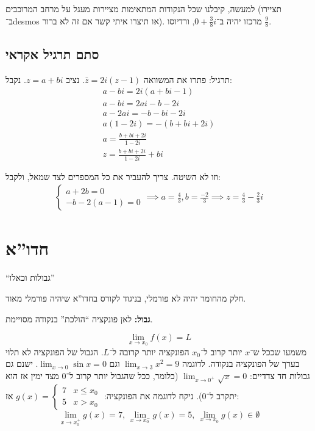 \documentclass[]{article}
\begin{document}
	למעשה, קיבלנו שכל הנקודות המתאימות מציירות מעגל על מרחב המרוכבים (תציירו ב־desmos או תיצרו איתי קשר אם זה לא ברור). מרכזו יהיה ב־$0 + \frac{3}{8}i$, ורדיוסו $\frac{9}{8}$. 
	
	\subsection{סתם תרגיל אקראי}
	תרגיל: פתרו את המשוואה $\bar z = 2i(z - 1)$. נציב $z = a + bi$. נקבל: 
	\begin{gather}
		a - bi = 2i(a + bi - 1) \\
		a - bi = 2ai - b - 2i \\
		a - 2ai = -b -bi - 2i \\
		a(1 - 2i) = - (b + bi + 2i) \\
		a = \frac{b + bi + 2i}{1 - 2i} \\
		z = \frac{b + bi + 2i}{1 - 2i} + bi
	\end{gather}
	
	וזו לא השיטה. צריך להעביר את כל המספרים לצד שמאל, ולקבל: 
	\begin{gather}
		\begin{cases}
			a + 2b = 0 \\
			-b - 2(a - 1) = 0
		\end{cases}
		\implies a = \frac{4}{3}, b = \frac{-2}{3} \implies z = \frac{4}{3} - \frac{2}{3}i
	\end{gather}
	
	\section{חדו''א}
	``גבולות וכאלו''
	
	חלק מהחומר יהיה לא פורמלי, בניגוד לקורס בחדו''א שיהיה פורמלי מאוד. 
	
	\textbf{גבול: }לאן פונקציה ``הולכת'' בנקודה מסויימת. 
	
	\[ \lim_{x \to x_0} f(x) = L \]
	משמעו שככל ש־$x$ יותר קרוב ל־$x_0 $ הפונקציה יותר קרובה ל־$L$. הגבול של הפונקציה לא תלוי בערך של הפונקציה בנקודה. 
	לדוגמה $\lim_{x \to 3} x^2 = 9$ וגם $\lim_{x \to 0} \sin x = 0$. ישנם גם גבולות חד צדדיים: $\lim_{x \to 0^+} \sqrt{x} = 0 $ (כלומר, ככל שהגבול יותר קרוב ל־0 מצד ימין אז הוא יתקרב ל־0). 
	ניקח לדוגמה את הפונקציה: 
	$g(x) = \begin{cases}
		7 &x \le x_0 \\
		5 &x > x_0
	\end{cases}$
	אז: 
	\[ \lim_{x \to x_0^+} g(x) = 7, \ \lim_{x \to x_0^-} g(x) = 5, \ \lim_{x \to x_0} g(x) \in \emptyset \]
	
\end{document}
